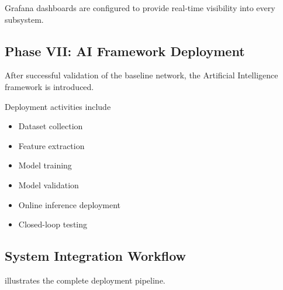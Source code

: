 \documentclass[12pt,a4paper]{article}\usepackage[a4paper,margin=1in]{geometry}\usepackage{graphicx}\usepackage{longtable}\usepackage{booktabs}\usepackage{hyperref}\usepackage{enumitem}\usepackage{amsmath}\usepackage{tikz}\usepackage{pgfgantt}\usepackage{setspace}\setstretch{1.15}\usetikzlibrary{positioning,arrows.meta,shapes.geometric}
\begin{document}
	Grafana dashboards are configured to provide real-time visibility into every subsystem.
	
	
	\subsection{Phase VII: AI Framework Deployment}
	
	After successful validation of the baseline network, the Artificial Intelligence framework is introduced.
	
	Deployment activities include
	
	\begin{itemize}
		
		\item Dataset collection
		
		\item Feature extraction
		
		\item Model training
		
		\item Model validation
		
		\item Online inference deployment
		
		\item Closed-loop testing
		
	\end{itemize}
	
	
	\subsection{System Integration Workflow}
	
	 illustrates the complete deployment pipeline.
	
\end{document}
